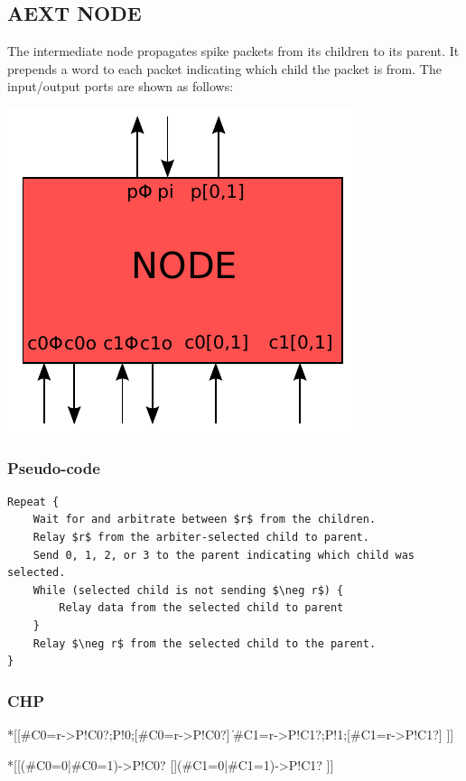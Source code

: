 \documentclass{article}
\begin{document}
\subsection{AEXT NODE \label{sec:AEXT_NODE}}

The intermediate node propagates spike packets from its children to its parent.
It prepends a word to each packet indicating which child the packet is from.
The input/output ports are shown as follows:

\begin{center}
  \includegraphics[width=.25\textwidth]{img/aext_node.pdf}
\end{center}

\subsubsection*{Pseudo-code}

\begin{lstlisting}[mathescape]
Repeat {
    Wait for and arbitrate between $r$ from the children.
    Relay $r$ from the arbiter-selected child to parent.
    Send 0, 1, 2, or 3 to the parent indicating which child was selected.
    While (selected child is not sending $\neg r$) {
        Relay data from the selected child to parent
    }
    Relay $\neg r$ from the selected child to the parent.
}
\end{lstlisting}

\subsubsection*{CHP}

\begin{csp}
*[[#{C0=r}->P!C0?;P!0;[#{C0=\neg r}->P!C0?]
  \|#{C1=r}->P!C1?;P!1;[#{C1=\neg r}->P!C1?]
 ]]

*[[(#{C0=0}|#{C0=1})->P!C0?
  [](#{C1=0}|#{C1=1})->P!C1?
 ]]
\end{csp}
\end{document}
